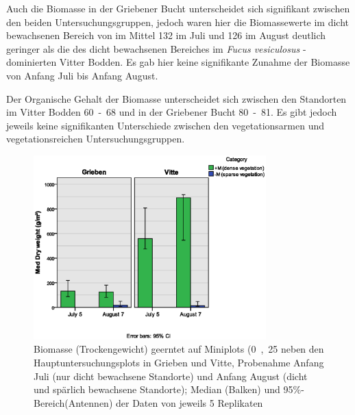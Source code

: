 Auch die Biomasse in der Griebener Bucht unterscheidet sich signifikant zwischen den beiden Untersuchungsgruppen, jedoch waren hier die Biomassewerte im dicht bewachsenen Bereich von im Mittel \unit{132}{\gram\per\metre\squared} im Juli und \unit{126}{\gram\per\metre\squared} im August  deutlich geringer als die des dicht bewachsenen Bereiches im \textit{Fucus vesiculosus }-dominierten Vitter Bodden. Es gab hier keine signifikante Zunahme der Biomasse von Anfang Juli bis Anfang August.

Der Organische Gehalt der Biomasse unterscheidet sich zwischen den Standorten im Vitter Bodden \unit{60-68}{\gram\per\metre\squared} und in der Griebener Bucht \unit{80-81}{\gram\per\metre\squared}. Es gibt jedoch jeweils keine signifikanten Unterschiede zwischen den vegetationsarmen und vegetationsreichen Untersuchungsgruppen.


\begin{figure}[!htb]
\centering
\includegraphics[width=0.80\textwidth]{images/biomass/biomasse_berichtigt1.eps}
\caption[Biomasse an den Hiddenseer Standorten]{Biomasse (Trockengewicht) geerntet auf Miniplots (\unit{0,25}{\metre\squared} neben den Hauptuntersuchungsplots in Grieben und Vitte, Probenahme Anfang Juli (nur dicht bewachsene Standorte) und Anfang August (dicht und spärlich bewachsene Standorte); Median (Balken) und \unit{95}{\%}-Bereich(Antennen) der Daten von jeweils 5 Replikaten}
\label{fig:biomasse}
\end{figure}

